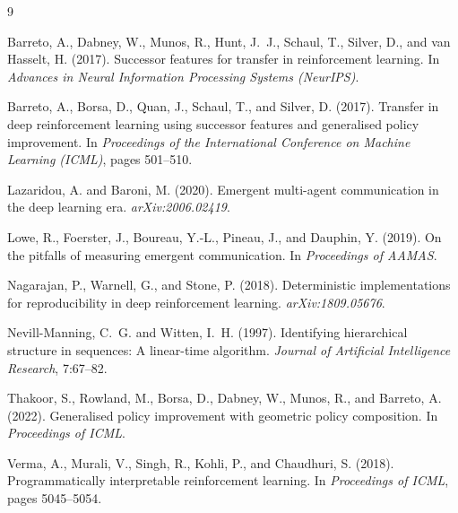 \documentclass[12pt]{article}
\begin{document}

\begin{thebibliography}{9}

Barreto, A., Dabney, W., Munos, R., Hunt, J.~J., Schaul, T.,
Silver, D., and van Hasselt, H. (2017).
Successor features for transfer in reinforcement learning.
In \emph{Advances in Neural Information Processing Systems (NeurIPS)}.

Barreto, A., Borsa, D., Quan, J., Schaul, T., and Silver, D. (2017).
Transfer in deep reinforcement learning using successor features and
generalised policy improvement.
In \emph{Proceedings of the International Conference on Machine Learning
(ICML)}, pages 501--510.

Lazaridou, A. and Baroni, M. (2020).
Emergent multi-agent communication in the deep learning era.
\emph{arXiv:2006.02419}.

Lowe, R., Foerster, J., Boureau, Y.-L., Pineau, J., and Dauphin, Y. (2019).
On the pitfalls of measuring emergent communication.
In \emph{Proceedings of AAMAS}.

Nagarajan, P., Warnell, G., and Stone, P. (2018).
Deterministic implementations for reproducibility in deep reinforcement
learning.
\emph{arXiv:1809.05676}.

Nevill-Manning, C.~G. and Witten, I.~H. (1997).
Identifying hierarchical structure in sequences: A linear-time algorithm.
\emph{Journal of Artificial Intelligence Research}, 7:67--82.

Thakoor, S., Rowland, M., Borsa, D., Dabney, W., Munos, R.,
and Barreto, A. (2022).
Generalised policy improvement with geometric policy composition.
In \emph{Proceedings of ICML}.

Verma, A., Murali, V., Singh, R., Kohli, P., and Chaudhuri, S. (2018).
Programmatically interpretable reinforcement learning.
In \emph{Proceedings of ICML}, pages 5045--5054.

\end{thebibliography}
\end{document}
